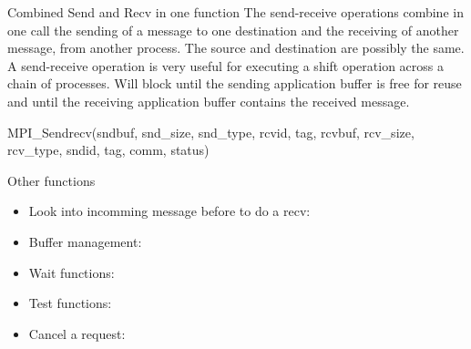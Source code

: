 \documentclass[aspectratio=43]{beamer}
\begin{document}
\begin{frame}[fragile]{Combined Send and Recv in one function}
\justifying
The send-receive operations combine in one call the sending of a message to one destination and the receiving of another message, from another process.
The source and destination are possibly the same.
A send-receive operation is very useful for executing a shift operation across a chain of processes.
Will block until the sending application buffer is free for reuse and until the receiving application buffer contains the received message.
\begin{Pseudolisting}[]{}
MPI_Sendrecv(sndbuf, snd_size, snd_type, rcvid, tag,
             rcvbuf, rcv_size, rcv_type, sndid, tag,
             comm, status)
\end{Pseudolisting}
\end{frame}

\begin{frame}[fragile]{Other functions}
\begin{itemize}
\item Look into incomming message before to do a recv:\\\hspace{1cm}
\item Buffer management:\\\hspace{1cm}
\item Wait functions:\\\hspace{1cm}
\item Test functions:\\\hspace{1cm}
\item Cancel a request:\\\hspace{1cm}
\end{itemize}
\end{frame}
\end{document}
